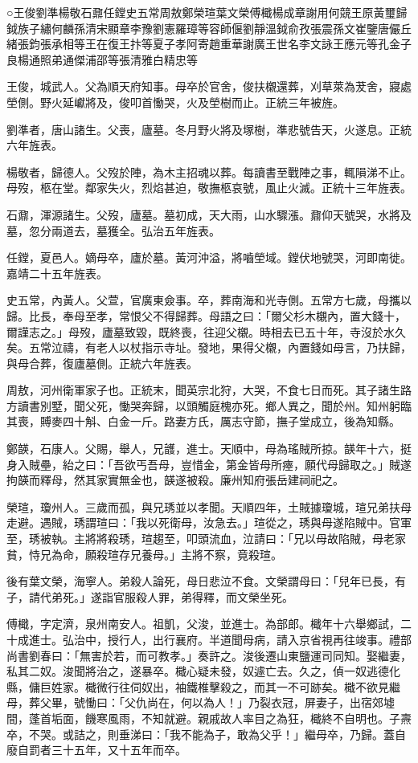 
\begin{pinyinscope}
○王俊劉準楊敬石鼐任鏜史五常周敖鄭榮瑄葉文榮傅檝楊成章謝用何競王原黃璽歸鉞族子繡何麟孫清宋顯章李豫劉憲羅璋等容師偃劉靜溫鉞俞孜張震孫文崔鑒唐儼丘緒張鈞張承相等王在復王抃等夏子孝阿寄趙重華謝廣王世名李文詠王應元等孔金子良楊通照弟通傑浦邵等張清雅白精忠等

王俊，城武人。父為順天府知事。母卒於官舍，俊扶櫬還葬，刈草萊為茇舍，寢處塋側。野火延巘將及，俊叩首慟哭，火及塋樹而止。正統三年被旌。

劉準者，唐山諸生。父喪，廬墓。冬月野火將及塚樹，準悲號告天，火遂息。正統六年旌表。

楊敬者，歸德人。父歿於陣，為木主招魂以葬。每讀書至戰陣之事，輒隕涕不止。母歿，柩在堂。鄰家失火，烈焰甚迫，敬撫柩哀號，風止火滅。正統十三年旌表。

石鼐，渾源諸生。父歿，廬墓。墓初成，天大雨，山水驟漲。鼐仰天號哭，水將及墓，忽分兩道去，墓獲全。弘治五年旌表。

任鏜，夏邑人。嫡母卒，廬於墓。黃河沖溢，將嚙塋域。鏜伏地號哭，河即南徙。嘉靖二十五年旌表。

史五常，內黃人。父萱，官廣東僉事。卒，葬南海和光寺側。五常方七歲，母攜以歸。比長，奉母至孝，常恨父不得歸葬。母語之曰：「爾父杉木櫬內，置大錢十，爾謹志之。」母歿，廬墓致毀，既終喪，往迎父櫬。時相去已五十年，寺沒於水久矣。五常泣禱，有老人以杖指示寺址。發地，果得父櫬，內置錢如母言，乃扶歸，與母合葬，復廬墓側。正統六年旌表。

周敖，河州衛軍家子也。正統末，聞英宗北狩，大哭，不食七日而死。其子諸生路方讀書別墅，聞父死，慟哭奔歸，以頭觸庭槐亦死。鄉人異之，聞於州。知州躬臨其喪，賻麥四十斛、白金一斤。路妻方氏，厲志守節，撫子堂成立，後為知縣。

鄭韺，石康人。父賜，舉人，兄頀，進士。天順中，母為瑤賊所掠。韺年十六，挺身入賊壘，紿之曰：「吾欲丐吾母，豈惜金，第金皆母所瘞，願代母歸取之。」賊遂拘韺而釋母，然其家實無金也，韺遂被殺。廉州知府張岳建祠祀之。

榮瑄，瓊州人。三歲而孤，與兄琇並以孝聞。天順四年，土賊據瓊城，瑄兄弟扶母走避。遇賊，琇謂瑄曰：「我以死衛母，汝急去。」瑄從之，琇與母遂陷賊中。官軍至，琇被執。主將將殺琇，瑄趨至，叩頭流血，泣請曰：「兄以母故陷賊，母老家貧，恃兄為命，願殺瑄存兄養母。」主將不察，竟殺瑄。

後有葉文榮，海寧人。弟殺人論死，母日悲泣不食。文榮謂母曰：「兒年已長，有子，請代弟死。」遂詣官服殺人罪，弟得釋，而文榮坐死。

傅檝，字定濟，泉州南安人。祖凱，父浚，並進士。為部郎。檝年十六舉鄉試，二十成進士。弘治中，授行人，出行襄府。半道聞母病，請入京省視再往竣事。禮部尚書劉春曰：「無害於若，而可教孝。」奏許之。浚後遷山東鹽運司同知。娶繼妻，私其二奴。浚聞將治之，遂暴卒。檝心疑未發，奴遽亡去。久之，偵一奴逃德化縣，傭巨姓家。檝微行往伺奴出，袖鐵椎擊殺之，而其一不可跡矣。檝不欲見繼母，葬父畢，號慟曰：「父仇尚在，何以為人！」乃裂衣冠，屏妻子，出宿郊墟間，蓬首垢面，饑寒風雨，不知就避。親戚故人率目之為狂，檝終不自明也。子燾卒，不哭。或詰之，則垂涕曰：「我不能為子，敢為父乎！」繼母卒，乃歸。蓋自廢自罰者三十五年，又十五年而卒。


\end{pinyinscope}
